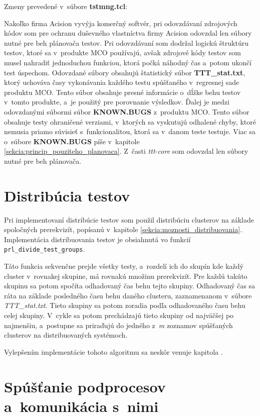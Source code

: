 Zmeny prevedené v~súbore \textbf{tstmng.tcl}:

Nakoľko firma Acision vyvýja komerčný softvér, pri odovzdávaní zdrojových kódov 
som pre ochranu duševného vlastníctva firmy Acision odovzdal len súbory nutné pre 
beh plánovača testov. Pri odovzdávaní som dodržal logickú štruktúru testov, ktoré sa
v~produkte MCO používajú, avšak zdrojové kódy testov som musel nahradiť jednoduchou funkciou,
ktorá počká náhodný čas a~potom ukončí test úspechom.
Odovzdané súbory obsahujú štatistický súbor \textbf{TTT\_stat.txt}, ktorý uchováva časy vykonávania
každého testu spúšťaného v~regresnej sade produktu MCO. Tento súbor obsahuje presné informácie o~dĺžke
behu testov v~tomto produkte, a~je použitý pre porovnanie výsledkov.
Ďalej je medzi odovzdanými súbormi súbor \textbf{KNOWN.BUGS} z~produktu MCO. Tento súbor obsahuje testy
ohraničené verziami, v~ktorých sa vyskutujú odhalené chyby, ktoré nemusia priamo súvisieť
s~funkcionalitou, ktorá sa v~danom teste testuje. Viac sa o~súbore \textbf{KNOWN.BUGS} píše v~kapitole \ref{sekcia:princip_pouziteho_planovaca}.
Z~časti \textit{ttt-core} som odovzdal len súbory nutné pre beh plánovača. 

\section{Distribúcia testov}
\label{sekcia:distribucia_testov}
Pri implementovaní distribúcie testov som použil distribúciu clusterov na základe spoločných prerekvizít, 
popísanú v~kapitole \ref{sekcia:moznosti_distribuovania}.
Implementácia distribuovania testov je obsiahnutá vo funkcií \texttt{prl\_divide\_test\_groups}.

Táto funkcia sekvenčne prejde všetky testy, a~rozdelí ich do skupín kde každý cluster v~rovnakej skupine,
má rovnakú množinu prerekvizít. Pre každú takúto skupinu sa potom spočíta odhadovaný čas behu tejto skupiny.
Odhadovaný čas sa ráta na základe posledného času behu daného clusteru, zaznamenanom v~súbore \textit{TTT\_stat.txt}.
Tieto skupiny sa potom zoradia podľa odhadovaného času behu celej skupiny.
V~cykle sa potom prechádzajú tieto skupiny od najväčšej po najmenšiu, a~postupne sa priraďujú 
do jedného z~\emph{m} zoznamov spúšťaných clusterov na distribuovaných systémoch.

Vylepšením implementácie tohoto algoritmu sa neskôr venuje kapitola \label{kapitola:optimalizacie}. 


\section{Spúšťanie podprocesov a~komunikácia s~nimi}
\label{sekcia:spustanie_podprocesov}


